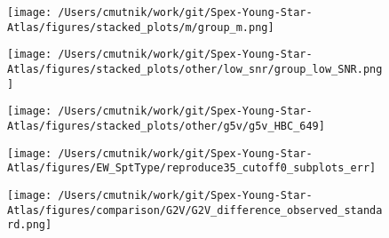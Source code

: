 \begin{figure}[h!]
\begin{center}
\texttt{[image: /Users/cmutnik/work/git/Spex-Young-Star-Atlas/figures/stacked\_plots/m/group\_m.png]}
\caption{ \protect}
\end{center}
\end{figure}


\begin{figure}[h!]
\begin{center}
\texttt{[image: /Users/cmutnik/work/git/Spex-Young-Star-Atlas/figures/stacked\_plots/other/low\_snr/group\_low\_SNR.png]}
\caption{ \protect}
\end{center}
\end{figure}


\begin{figure}[h!]
\begin{center}
\texttt{[image: /Users/cmutnik/work/git/Spex-Young-Star-Atlas/figures/stacked\_plots/other/g5v/g5v\_HBC\_649]}
\caption{ \protect}
\end{center}
\end{figure}




\begin{figure}[h!]
\begin{center}
\texttt{[image: /Users/cmutnik/work/git/Spex-Young-Star-Atlas/figures/EW\_SptType/reproduce35\_cutoff0\_subplots\_err]}
\caption{ \protect}
\end{center}
\end{figure}




\begin{figure}[h!]
\begin{center}
\texttt{[image: /Users/cmutnik/work/git/Spex-Young-Star-Atlas/figures/comparison/G2V/G2V\_difference\_observed\_standard.png]}
\caption{ \protect}
\end{center}
\end{figure}


